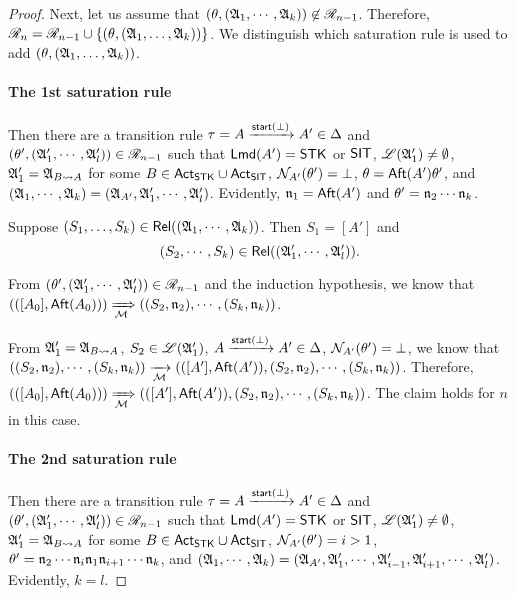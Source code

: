 \begin{proof}
Next, let us assume that $(\theta, ({\mathfrak{A} }_1, \cdots, {\mathfrak{A} }_k)) \not \in  \mathscr{R}_{n-1}$.
Therefore, $\mathscr{R}_{n} = \mathscr{R}_{n-1} \cup \{(\theta,({\mathfrak{A} }_1,\dots,{\mathfrak{A} }_k))\}$.  
%
We distinguish which saturation rule is used to add $(\theta,({\mathfrak{A} }_1,\dots,{\mathfrak{A} }_k))$.


\paragraph*{The 1st saturation rule} Then  there are a transition rule $\tau = A \xrightarrow{{\mathsf{start} }(\bot)} A'  \in \Delta$ and $(\theta', ({\mathfrak{A} }'_1, \cdots, {\mathfrak{A} }'_l)) \in \mathscr{R}_{n-1}$ such that ${\sf Lmd}(A')=\mathsf{STK}$ or ${\sf SIT}$, ${\mathscr{L} }({\mathfrak{A} }'_1) \neq \emptyset$, ${\mathfrak{A} }'_1 = {\mathfrak{A} }_{B\rightsquigarrow A}$ for some $B \in {\sf Act}_{\sf STK}\cup{\sf Act}_{\sf SIT}$, $\mathcal{N}_{A'}(\theta') = \bot$, $\theta = {\sf Aft}(A') \theta'$, and $({\mathfrak{A} }_1, \cdots, {\mathfrak{A} }_k) = ({\mathfrak{A} }_{A'}, {\mathfrak{A} }'_1, \cdots, {\mathfrak{A} }'_l)$. 
Evidently, $\mathfrak{n}_1 = {\sf Aft}(A')$ and $\theta' = \mathfrak{n}_2 \cdots \mathfrak{n}_k$. 

Suppose $(S_1,\dots,S_k) \in \mathsf{Rel}(({\mathfrak{A} }_1, \cdots, {\mathfrak{A} }_k))$. Then $S_1 = [A']$ and 
$$(S_2, \cdots, S_k) \in \mathsf{Rel}(({\mathfrak{A} }'_1, \cdots, {\mathfrak{A} }'_l)).$$ 

From $(\theta', ({\mathfrak{A} }'_1, \cdots, {\mathfrak{A} }'_l)) \in \mathscr{R}_{n-1}$ and the induction hypothesis, we know that $(([A_0], {\sf Aft}(A_0))) \xRightarrow[{\mathcal{M} }]{} ((S_2, \mathfrak{n}_2), \cdots, (S_k, \mathfrak{n}_k))$. 

From ${\mathfrak{A} }'_1 = {\mathfrak{A} }_{B\rightsquigarrow A}$, $S_2 \in {\mathscr{L} }({\mathfrak{A} }'_1)$, $A \xrightarrow{{\mathsf{start} }(\bot)}A'  \in \Delta$, $\mathcal{N}_{A'}(\theta') = \bot$, we know that 
$((S_2, \mathfrak{n}_2), \cdots, (S_k, \mathfrak{n}_k)) \xrightarrow[{\mathcal{M} }]{} (([A'], {\sf Aft}(A')), (S_2, \mathfrak{n}_2), \cdots, (S_k, \mathfrak{n}_k))$.
Therefore, 
$(([A_0], {\sf Aft}(A_0))) \xRightarrow[{\mathcal{M} }]{} (([A'], {\sf Aft}(A')), (S_2, \mathfrak{n}_2), \cdots, (S_k, \mathfrak{n}_k))$. 
The claim holds for $n$ in this case. 


\paragraph*{The 2nd saturation rule} Then there are a transition rule $\tau = A \xrightarrow{{\mathsf{start} }(\bot)} A'  \in \Delta$ and $(\theta', ({\mathfrak{A} }'_1, \cdots, {\mathfrak{A} }'_l)) \in \mathscr{R}_{n-1}$ such that ${\sf Lmd}(A')=\mathsf{STK}$ or ${\sf SIT}$, ${\mathscr{L} }({\mathfrak{A} }'_1) \neq \emptyset$, ${\mathfrak{A} }'_1 = {\mathfrak{A} }_{B\rightsquigarrow A}$ for some $B \in {\sf Act}_{\sf STK} \cup {\sf Act}_{\sf SIT}$, $\mathcal{N}_{A'}(\theta') = i > 1$, 
$\theta' = \mathfrak{n}_2  \cdots  \mathfrak{n}_{i} \mathfrak{n}_1  \mathfrak{n}_{i+1}  \cdots  \mathfrak{n}_k$, and 
$({\mathfrak{A} }_1, \cdots, {\mathfrak{A} }_k) = ({\mathfrak{A} }_{A'}, {\mathfrak{A} }'_1, \cdots, {\mathfrak{A} }'_{i-1}, {\mathfrak{A} }'_{i+1}, \cdots, {\mathfrak{A} }'_l)$. Evidently, $k = l$.


\end{proof}
